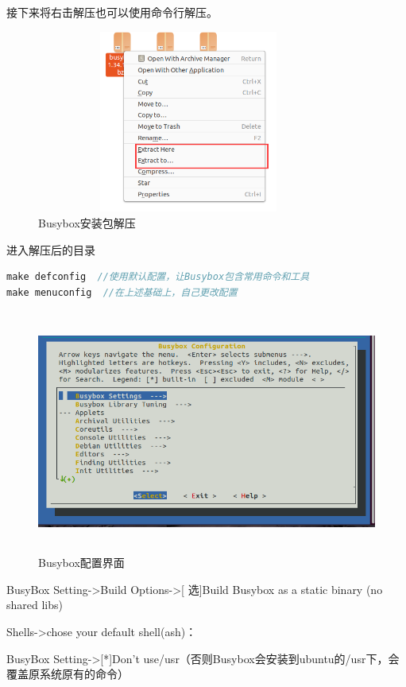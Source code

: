 接下来将右击解压也可以使用命令行解压。

\begin{figure}[H]
\centering
\includegraphics[width=10cm,height=6cm]{figures/09-02-Busybox安装2.png}
\caption{Busybox安装包解压}
\end{figure}  

进入解压后的目录

\begin{lstlisting}[language=Rust]
make defconfig  //使用默认配置，让Busybox包含常用命令和工具
make menuconfig  //在上述基础上，自己更改配置
\end{lstlisting}

\begin{figure}[H]
\centering
\includegraphics[width=14cm,height=8cm]{figures/09-02-Busybox安装3.png}
\caption{Busybox配置界面}
\end{figure}  

BusyBox Setting->Build Options->[ 选]Build Busybox as a static binary (no shared libs)

Shells->chose your default shell(ash)：

BusyBox Setting->[*]Don’t use/usr（否则Busybox会安装到ubuntu的/usr下，会覆盖原系统原有的命令）

